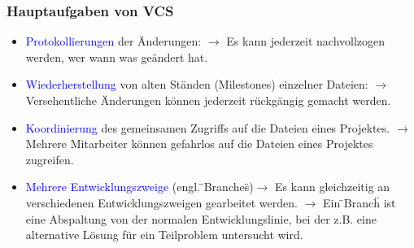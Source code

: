 \subsubsection{Hauptaufgaben von VCS}
\begin{minipage}{\linewidth}
	\begin{itemize}
		\item \textcolor{blue}{Protokollierungen} der Änderungen: \newline $\rightarrow$ Es kann jederzeit nachvollzogen werden, wer wann was geändert hat.
		\item \textcolor{blue}{Wiederherstellung} von alten Ständen (Milestones) einzelner Dateien: \newline $\rightarrow$ Versehentliche Änderungen können jederzeit rückgängig gemacht werden.
		\item \textcolor{blue}{Koordinierung} des gemeinsamen Zugriffs auf die Dateien eines Projektes. \newline $\rightarrow$ Mehrere Mitarbeiter können gefahrlos auf die Dateien eines Projektes zugreifen. 
		\item \textcolor{blue}{Mehrere Entwicklungszweige} (engl. \"{}Branches\"{})\newline $\rightarrow$ Es kann gleichzeitig an verschiedenen Entwicklungszweigen gearbeitet werden. \newline $\rightarrow$ Ein \"{}Branch\"{} ist eine Abspaltung von der normalen Entwicklungslinie, bei der z.B. eine alternative Lösung für ein Teilproblem untersucht wird.
	\end{itemize}
\end{minipage}
